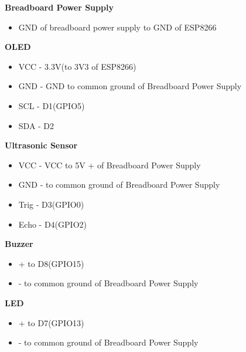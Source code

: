 \documentclass[12pt,a4paper]{article}
\begin{document}
\begin{flushleft}
\textbf{Breadboard Power Supply}
\begin{itemize}[noitemsep,nolistsep]
    \item GND of breadboard power supply to GND of ESP8266
\end{itemize}
\vspace{1mm}
\textbf{OLED}
\begin{itemize}[noitemsep,nolistsep]
    \item VCC - 3.3V(to 3V3 of ESP8266)
    \item GND - GND to common ground of Breadboard Power Supply
    \item SCL - D1(GPIO5)
    \item SDA - D2
\end{itemize}
\vspace{1mm}
\textbf{Ultrasonic Sensor}
\begin{itemize}[noitemsep,nolistsep]
    \item VCC - VCC to 5V + of Breadboard Power Supply
    \item GND - to common ground of Breadboard Power Supply
    \item Trig - D3(GPIO0)
    \item Echo - D4(GPIO2)
\end{itemize}

\textbf{Buzzer}
\begin{itemize}[noitemsep,nolistsep]
    \item + to D8(GPIO15)
    \item - to common ground of Breadboard Power Supply
\end{itemize}
\vspace{1mm}
\textbf{LED}
\begin{itemize}[noitemsep,nolistsep]
    \item + to D7(GPIO13)
    \item - to common ground of Breadboard Power Supply
\end{itemize}
\clearpage


\end{flushleft}
\end{document}
